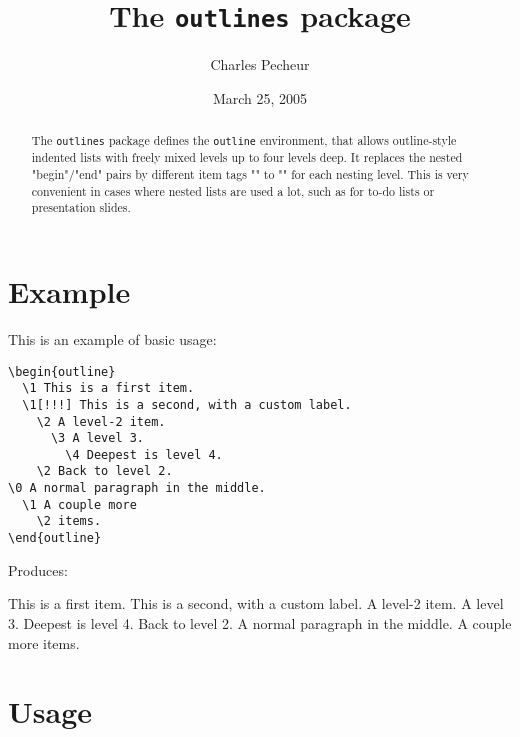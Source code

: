 \documentclass[11pt]{article}
\title{The \texttt{outlines} package}
\author{Charles Pecheur}
\date{March 25, 2005}
\begin{document}
\maketitle

\begin{abstract}
The \texttt{outlines} package defines the \texttt{outline} environment,
that allows outline-style indented lists with freely mixed levels up
to four levels deep.  It replaces the nested "begin"/"end" pairs by
different item tags "\1" to "\4" for each nesting level.  This is very
convenient in cases where nested lists are used a lot, such as for to-do
lists or presentation slides.
\end{abstract}

\section{Example}
This is an example of basic usage:


{\small\begin{verbatim}
\begin{outline}
  \1 This is a first item.
  \1[!!!] This is a second, with a custom label.
    \2 A level-2 item.
      \3 A level 3.
        \4 Deepest is level 4.
    \2 Back to level 2.
\0 A normal paragraph in the middle.
  \1 A couple more  
    \2 items.
\end{outline}
\end{verbatim}}

Produces:

{\small
\begin{outline}
  \1 This is a first item.  
  \1[!!!] This is a second, with a custom label.
    \2 A level-2 item.
      \3 A level 3.
        \4 Deepest is level 4.
    \2 Back to level 2.
\0 A normal paragraph in the middle.
  \1 A couple more
    \2 items.
\end{outline}
}

\section{Usage}
\end{document}
